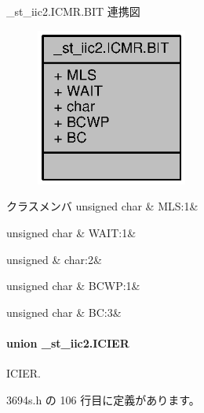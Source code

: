 \+\_\+st\+\_\+iic2.\+I\+C\+M\+R.\+B\+I\+T 連携図
\nopagebreak
\begin{figure}[H]
\begin{center}
\leavevmode
\includegraphics[width=141pt]{d6/d9f/struct__st__iic2_8ICMR_8BIT__coll__graph}
\end{center}
\end{figure}
\begin{DoxyFields}{クラスメンバ}
unsigned char\label{3694s_8h_a17bf9be4496b631d9e8bdd2e8850b528}
&
M\+L\+S\+:1&
\\
\hline

unsigned char\label{3694s_8h_ad5cc6a0064b5c25ba37826aa3fda910c}
&
W\+A\+I\+T\+:1&
\\
\hline

unsigned\label{3694s_8h_aa87deb01c5f539e6bda34829c8ef2368}
&
char\+:2&
\\
\hline

unsigned char\label{3694s_8h_a2a71df1854a557a294f2c67da70a8282}
&
B\+C\+W\+P\+:1&
\\
\hline

unsigned char\label{3694s_8h_af85b7b377112c272bc87f3e73f10508d}
&
B\+C\+:3&
\\
\hline

\end{DoxyFields}
\label{union__st__iic2_8ICIER}
\paragraph{union \+\_\+st\+\_\+iic2.\+I\+C\+I\+E\+R}
I\+C\+I\+E\+R. 

 3694s.\+h の 106 行目に定義があります。



